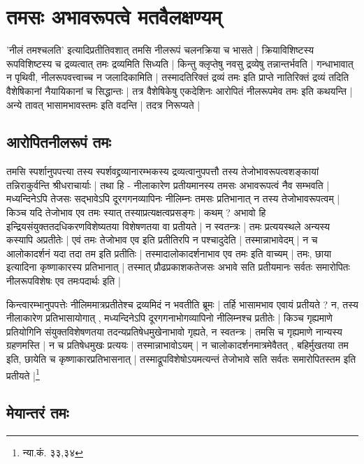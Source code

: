 \section{तमसः अभावरूपत्वे मतवैलक्षण्यम्}

'नीलं तमश्चलति' इत्यादिप्रतीतिवशात् तमसि नीलरूपं चलनक्रिया च भासते | क्रियाविशिष्टस्य रूपविशिष्टस्य च द्रव्यत्वात् तमः द्रव्यमिति सिध्यति | किन्तु क्लृप्तेषु नवसु द्रव्येषु तन्नान्तर्भवति | गन्धाभावात् न पृथिवी, नीलरूपवत्त्वाच्च न जलादिकामिति | तस्मादतिरिक्तं द्रव्यं तमः‌ इति प्राप्ते नातिरिक्तं द्रव्यं तदिति वैशेषिकानां नैयायिकानां च सिद्धान्तः | तत्र वैशेषिकेषु एकदेशिनः आरोपितं नीलरूपमेव तमः इति कथयन्ति | अन्ये तावत् भासामभावस्तमः इति वदन्ति | तदत्र निरूप्यते |

\subsection{आरोपितनीलरूपं तमः}

तमसि स्पर्शानुपपत्त्या तस्य स्पर्शवद्द्रव्यानारम्भकस्य द्रव्यत्वानुपपत्तौ तस्य तेजोभावरूपत्वशङ्कायां तन्निराकुर्वन्ति श्रीधराचार्याः | तथा हि - नीलाकारेण प्रतीयमानस्य तमसः अभावरूपत्वं नैव सम्भवति | मध्यन्दिनेऽपि तेजसः सद्भावेऽपि दूरगगनव्यापिनः नीलिम्नः तमसः प्रतिभानात् न तस्य तेजोभावरूपत्वम् | किञ्च यदि तेजोभाव एव तमः स्यात् तस्याप्रत्यक्षत्वप्रसङ्गः | कथम् ? अभावो हि इन्द्रियसंयुक्ततदधिकरणविशेष्यतया विशेषणतया वा प्रतीयते | न स्वतन्त्रः | तमः प्रत्ययस्थले अन्यस्य कस्यापि अप्रतीतेः | एवं तमः तेजोभाव एव इति प्रतीतिरपि न पश्चादुदेति | तस्मान्नाभावेदम् | न च आलोकादर्शनं यदा तदा तम इति प्रतीतिः | तस्मादालोकादर्शनाभाव एव तमः इति वाच्यम् | तमः, छाया इत्यादिना कृष्णाकारस्य प्रतिभानात् | तस्मात् प्रौढप्रकाशकतेजसः अभावे सति प्रतीयमानः  सर्वतः समारोपितः  नीलरूपविशेषः एव तमःपदार्थः इति |

{\fontsize{11.7}{0}\selectfont\s किन्त्वारम्भानुपपत्तेः नीलिममात्रप्रतीतेश्च द्रव्यमिदं न भवतीति ब्रूमः | तर्हि भासामभाव एवायं प्रतीयते ? न, तस्य नीलाकारेण प्रतिभासायोगात् , मध्यन्दिनेऽपि दूरगगनाभोगव्यापिनो नीलिम्नश्च प्रतीतेः | किञ्च गृह्यमाणे प्रतियोगिनि संयुक्तविशेषणतया तदन्यप्रतिषेधमुखेनाभावो गृह्यते, न स्वतन्त्रः | तमसि च गृह्यमाणे नान्यस्य ग्रहणमस्ति | न च प्रतिषेधमुखः प्रत्ययः | तस्मान्नाभावोऽयम् | न चालोकादर्शनमात्रमेवैतत् , बहिर्मुखतया तम इति, छायेति च कृष्णाकारप्रतिभासनात् | तस्माद्रूपविशेषोऽयमत्यन्तं तेजोभावे सति सर्वतः समारोपितस्तम इति प्रतीयते |\footnote{न्या.कं. ३३,३४}}


\subsection{मेयान्तरं तमः}

